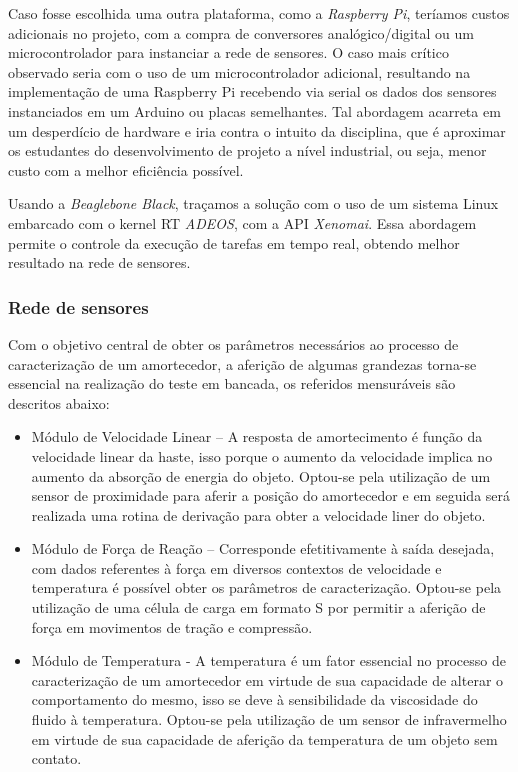 	Caso fosse escolhida uma outra plataforma, como a \emph{Raspberry Pi}, teríamos custos adicionais no projeto, com a compra de conversores analógico/digital ou um microcontrolador para instanciar a rede de sensores. O caso mais crítico observado seria com o uso de um microcontrolador adicional, resultando na implementação de uma Raspberry Pi recebendo via serial os dados dos sensores instanciados em um Arduino ou placas semelhantes. Tal abordagem acarreta em um desperdício de hardware e iria contra o intuito da disciplina, que é aproximar os estudantes do desenvolvimento de projeto a nível industrial, ou seja, menor custo com a melhor eficiência possível.

	Usando a \emph{Beaglebone Black}, traçamos a solução com o uso de um sistema Linux embarcado com o kernel RT \emph{ADEOS}, com a API \emph{Xenomai}. Essa abordagem permite o controle da execução de tarefas em tempo real, obtendo melhor resultado na rede de sensores.

	\subsubsection{Rede de sensores}

	Com o objetivo central de obter os parâmetros necessários ao processo de caracterização de um amortecedor, a aferição de algumas grandezas torna-se essencial na realização do teste em bancada, os referidos mensuráveis são descritos abaixo:

	\begin{itemize}

	\item Módulo de Velocidade Linear – A resposta de amortecimento é função da velocidade linear da haste, isso porque o aumento da velocidade implica no aumento da absorção de energia do objeto. Optou-se pela utilização de um sensor de proximidade para aferir a posição do amortecedor e em seguida será realizada uma rotina de derivação para obter a velocidade liner do objeto.

	\item Módulo de Força de Reação – Corresponde efetitivamente à saída desejada, com dados referentes à força em diversos contextos de velocidade e temperatura é possível obter os parâmetros de caracterização. Optou-se pela utilização de uma célula de carga em formato S por permitir a aferição de força em movimentos de tração e compressão.

	\item Módulo de Temperatura - A temperatura é um fator essencial no processo de caracterização de um amortecedor em virtude de sua capacidade de alterar o comportamento do mesmo, isso se deve à sensibilidade da viscosidade do fluido à temperatura. Optou-se pela utilização de um sensor de infravermelho em virtude de sua capacidade de aferição da temperatura de um objeto sem contato.

	\end{itemize}

